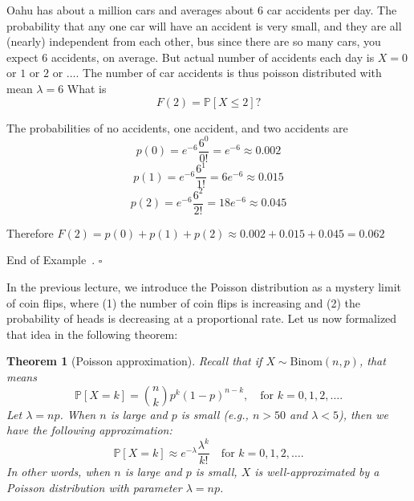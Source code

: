 \documentclass[10pt]{article}
\newtheorem{theorem}{Theorem}
\theoremstyle{definition}
\newtheorem{example}[theorem]{Example}
\renewenvironment{example}
{\begin{oldexample}}
  {\par\smallskip\hfill   End of Example~\theexample. $\square$    \par\end{oldexample}}
\newcommand{\1}[1]{\textbf{1}_{\left[#1\right]}} %
\def\P{\mathbb{P}} %
\begin{document}
\begin{example}
  Oahu has about a million cars and averages about 6 car accidents per day. The probability that any one
  car will have an accident is very small, and they are all (nearly) independent from each other, bus
  since there are so many cars, you expect 6 accidents, on average. But actual number of accidents each
  day is $X=0$ or $1$ or $2$ or $\ldots$. The number of car accidents is thus poisson distributed with
  mean $\lambda=6$ What is
  \begin{equation*}
    F(2) = \P\left[X \leq 2\right]?
  \end{equation*}
  
  The probabilities of no accidents, one accident, and two accidents
  are
  \begin{equation*}
    p(0) = e^{-6} \frac{6^{0}}{0!} = e^{-6} \approx 0.002
  \end{equation*}
  \begin{equation*}
    p(1) = e^{-6} \frac{6^{1}}{1!} = 6e^{-6} \approx 0.015
  \end{equation*}
  \begin{equation*}
    p(2) = e^{-6} \frac{6^{2}}{2!} = 18e^{-6} \approx 0.045
  \end{equation*}

  Therefore $F(2) = p(0)+p(1)+p(2)\approx 0.002+0.015+0.045  = 0.062$
\end{example}

In the previous lecture, we introduce the Poisson distribution as a mystery
limit of coin flips, where (1) the number of coin flips is increasing and (2)
the probability of heads is decreasing at a proportional rate. Let us now
formalized that idea in the following theorem:

\begin{theorem}[Poisson approximation]
  \label{thm:poisson-approximation}
  Recall that if  $X \sim \text{Binom}(n,p)$, that means
  \begin{equation*}
    \P\left[X = k \right] = {n\choose k}p^{k}(1-p)^{n-k}, \quad \text{for }k=0,1,2,\ldots.
  \end{equation*}
  Let $\lambda=np$. When $n$ is large and $p$ is small (e.g., $n>50$ and $\lambda<5$), then we have the
  following approximation:
  \begin{equation*}
    \P\left[X  = k \right] \approx e^{-\lambda}\frac{\lambda^{k}}{k!} \quad \text{for }k=0,1,2,\ldots.
  \end{equation*}
  In other words, when $n$ is large and $p$ is small, $X$ is well-approximated by a Poisson distribution
  with parameter $\lambda=np$.
\end{theorem}
\end{document}
